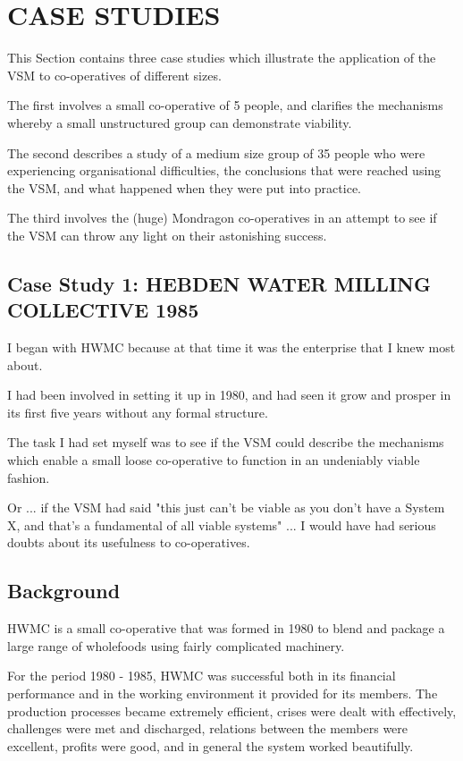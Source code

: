 \chapter{CASE STUDIES}\label{CASE STUDIES}
This Section contains three case studies which illustrate the application of the VSM to co-operatives of different sizes.

The first involves a small co-operative of 5 people, and clarifies the mechanisms whereby a small unstructured group can demonstrate viability.

The second describes a study of a medium size group of 35 people who were experiencing organisational difficulties, the conclusions that were reached using the VSM, and what happened when they were put into practice.

The third involves the (huge) Mondragon co-operatives in an attempt to see if the VSM can throw any light on their astonishing success.

\section*{Case Study 1: HEBDEN WATER MILLING COLLECTIVE 1985}
I began with HWMC because at that time it was the enterprise that I knew most about.

I had been involved in setting it up in 1980, and had seen it grow and prosper in its first five years without any formal structure.

The task I had set myself was to see if the VSM could describe the mechanisms which enable a small loose co-operative to function in an undeniably viable fashion.

Or ... if the VSM had said "this just can't be viable as you don't have a System X, and that's a fundamental of all viable systems" ... I would have had serious doubts about its usefulness to co-operatives.

\section*{Background}
HWMC is a small co-operative that was formed in 1980 to blend and package a large range of wholefoods using fairly complicated machinery.

For the period 1980 - 1985, HWMC was successful both in its financial performance and in the working environment it provided for its members. The production processes became extremely efficient, crises were dealt with effectively, challenges were met and discharged, relations between the members were excellent, profits were good, and in general the system worked beautifully.

